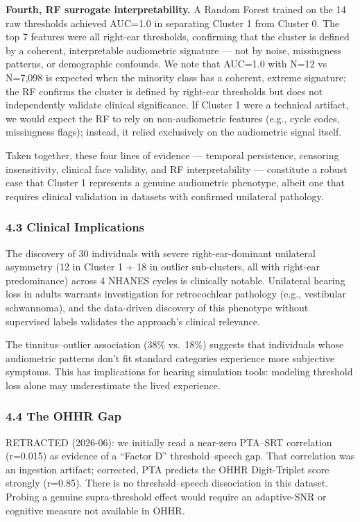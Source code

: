 \documentclass[
]{article}
\begin{document}
\textbf{Fourth, RF surrogate interpretability.} A Random Forest trained on the
14 raw thresholds achieved AUC=1.0 in separating Cluster 1 from Cluster 0. The
top 7 features were all right-ear thresholds, confirming that the cluster is
defined by a coherent, interpretable audiometric signature --- not by noise,
missingness patterns, or demographic confounds. We note that AUC=1.0 with N=12
vs N=7,098 is expected when the minority class has a coherent, extreme
signature; the RF confirms the cluster is defined by right-ear thresholds but
does not independently validate clinical significance. If Cluster 1 were a
technical artifact, we would expect the RF to rely on non-audiometric features
(e.g., cycle codes, missingness flags); instead, it relied exclusively on the
audiometric signal itself.

Taken together, these four lines of evidence --- temporal persistence, censoring
insensitivity, clinical face validity, and RF interpretability --- constitute a
robust case that Cluster 1 represents a genuine audiometric phenotype, albeit
one that requires clinical validation in datasets with confirmed unilateral
pathology.

\subsubsection{4.3 Clinical Implications}\label{clinical-implications}

The discovery of 30 individuals with severe right-ear-dominant unilateral
asymmetry (12 in Cluster 1 + 18 in outlier sub-clusters, all with right-ear
predominance) across 4 NHANES cycles is clinically notable. Unilateral hearing
loss in adults warrants investigation for retrocochlear pathology (e.g.,
vestibular schwannoma), and the data-driven discovery of this phenotype without
supervised labels validates the approach's clinical relevance.

The tinnitus--outlier association (38\% vs.~18\%) suggests that individuals
whose audiometric patterns don't fit standard categories experience more
subjective symptoms. This has implications for hearing simulation tools:
modeling threshold loss alone may underestimate the lived experience.

\subsubsection{4.4 The OHHR Gap}\label{the-ohhr-gap}

RETRACTED (2026-06): we initially read a near-zero PTA--SRT correlation (r=0.015)
as evidence of a ``Factor D'' threshold--speech gap. That correlation was an
ingestion artifact; corrected, PTA predicts the OHHR Digit-Triplet score strongly
(r=0.85). There is no threshold--speech dissociation in this dataset. Probing a
genuine supra-threshold effect would require an adaptive-SNR or cognitive measure
not available in OHHR.
\end{document}
